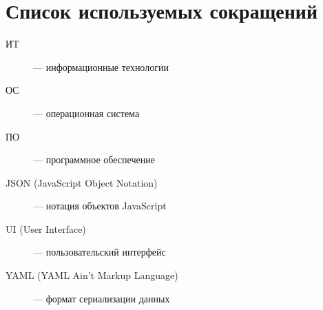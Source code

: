 \chapter*{Список используемых сокращений}

\begin{description}
	\item[ИT] --- информационные технологии
	\item[ОС] --- операционная система
	\item[ПО] --- программное обеспечение
	\item[JSON (JavaScript Object Notation)] --- нотация объектов JavaScript
	\item[UI (User Interface)] --- пользовательский интерфейс
	\item[YAML (YAML Ain't Markup Language)] --- формат сериализации данных
\end{description}

